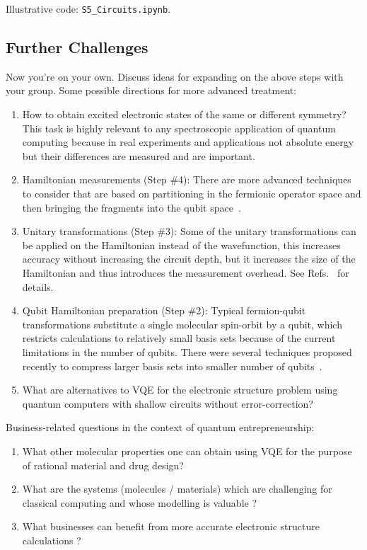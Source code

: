 \documentclass[12pt]{article}
\begin{document}
Illustrative code: \texttt{S5\_Circuits.ipynb}.

\subsection*{Further Challenges} \label{sec:challenges}

Now you're on your own.  Discuss ideas for expanding on the above steps with your group.  Some possible directions for more advanced treatment:
\begin{enumerate}
\item How to obtain excited electronic states of the same or different symmetry? This task is highly relevant to any spectroscopic 
application of quantum computing because in real experiments and applications not absolute energy but their differences are measured and are important.  

\item Hamiltonian measurements (Step \#4): There are more advanced techniques to consider that are based on partitioning in the fermionic operator space and then bringing the fragments into the qubit space~\cite{huggins2019efficient,Yen:2020tt}. 

\item Unitary transformations (Step \#3): Some of the unitary transformations can be applied on the Hamiltonian instead of the wavefunction, this increases 
accuracy without increasing the circuit depth, but it increases the size of the Hamiltonian and thus introduces the measurement overhead. 
See Refs.~\cite{Ryabinkin2019b,Lang:2020uv} for details. 

\item Qubit Hamiltonian preparation (Step \#2): Typical fermion-qubit transformations substitute a single molecular spin-orbit by a qubit, which restricts calculations to relatively small basis sets because of the current limitations in the number of qubits. There were several techniques proposed recently to 
compress larger basis sets into smaller number of qubits~\cite{Takeshita:2019wn,Bauman2019b}.

\item What are alternatives to VQE for the electronic structure problem using quantum computers with shallow circuits without error-correction?
  
\end{enumerate}

Business-related questions in the context of quantum entrepreneurship:

\begin{enumerate}
\item What other molecular properties one can obtain using VQE for the purpose of rational material and drug design?
\item What are the systems (molecules / materials) which are challenging for classical computing and whose modelling is valuable ?
\item What businesses can benefit from more accurate electronic structure calculations ?
\end{enumerate}



\end{document}
